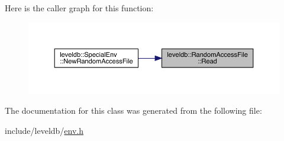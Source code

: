 Here is the caller graph for this function\+:
\nopagebreak
\begin{figure}[H]
\begin{center}
\leavevmode
\includegraphics[width=350pt]{classleveldb_1_1_random_access_file_a1a09fadcec904d9791a968acabca98d0_icgraph}
\end{center}
\end{figure}


The documentation for this class was generated from the following file\+:\begin{DoxyCompactItemize}
\item 
include/leveldb/\mbox{\hyperlink{env_8h}{env.\+h}}\end{DoxyCompactItemize}
